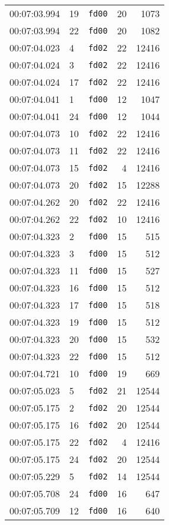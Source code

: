 \documentclass{article}
\begin{document}
\begin{longtable}{lllrr}
00:07:03.994 & 19 & \texttt{fd00} & 20 & 1073 \\
00:07:03.994 & 22 & \texttt{fd00} & 20 & 1082 \\
00:07:04.023 & 4 & \texttt{fd02} & 22 & 12416 \\
00:07:04.024 & 3 & \texttt{fd02} & 22 & 12416 \\
00:07:04.024 & 17 & \texttt{fd02} & 22 & 12416 \\
00:07:04.041 & 1 & \texttt{fd00} & 12 & 1047 \\
00:07:04.041 & 24 & \texttt{fd00} & 12 & 1044 \\
00:07:04.073 & 10 & \texttt{fd02} & 22 & 12416 \\
00:07:04.073 & 11 & \texttt{fd02} & 22 & 12416 \\
00:07:04.073 & 15 & \texttt{fd02} & 4 & 12416 \\
00:07:04.073 & 20 & \texttt{fd02} & 15 & 12288 \\
00:07:04.262 & 20 & \texttt{fd02} & 22 & 12416 \\
00:07:04.262 & 22 & \texttt{fd02} & 10 & 12416 \\
00:07:04.323 & 2 & \texttt{fd00} & 15 & 515 \\
00:07:04.323 & 3 & \texttt{fd00} & 15 & 512 \\
00:07:04.323 & 11 & \texttt{fd00} & 15 & 527 \\
00:07:04.323 & 16 & \texttt{fd00} & 15 & 512 \\
00:07:04.323 & 17 & \texttt{fd00} & 15 & 518 \\
00:07:04.323 & 19 & \texttt{fd00} & 15 & 512 \\
00:07:04.323 & 20 & \texttt{fd00} & 15 & 532 \\
00:07:04.323 & 22 & \texttt{fd00} & 15 & 512 \\
00:07:04.721 & 10 & \texttt{fd00} & 19 & 669 \\
00:07:05.023 & 5 & \texttt{fd02} & 21 & 12544 \\
00:07:05.175 & 2 & \texttt{fd02} & 20 & 12544 \\
00:07:05.175 & 16 & \texttt{fd02} & 20 & 12544 \\
00:07:05.175 & 22 & \texttt{fd02} & 4 & 12416 \\
00:07:05.175 & 24 & \texttt{fd02} & 20 & 12544 \\
00:07:05.229 & 5 & \texttt{fd02} & 14 & 12544 \\
00:07:05.708 & 24 & \texttt{fd00} & 16 & 647 \\
00:07:05.709 & 12 & \texttt{fd00} & 16 & 640 \\

\end{longtable}
\end{document}
